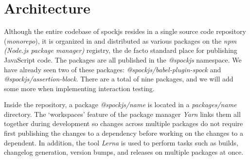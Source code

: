 \section{Architecture}
Although the entire codebase of spockjs resides in
a single source code repository (\textit{monorepo}),
it is organized in and distributed as various packages
on the \textit{npm (Node.js package manager)} registry,
\autocite{Npm}
the de facto standard place for publishing JavaScript code.
The packages are all published in the \textit{@spockjs} namespace.
We have already seen two of these packages:
\textit{@spockjs/babel-plugin-spock} and \textit{@spockjs/assertion-block}.
There are a total of nine packages,
and we will add some more when implementing interaction testing.

Inside the repository, a package \textit{@spockjs/name}
is located in a \textit{packages/name} directory.
The `workspaces' feature \autocite{YarnWorkspacesDoc}
of the package manager \textit{Yarn}
links them all together during development
so changes across multiple packages do not require
first publishing the changes to a dependency
before working on the changes to a dependent.
In addition, the tool \textit{Lerna} \autocite{LernaGithub} is used to
perform tasks such as builds, changelog generation, version bumps, and releases
on multiple packages at once.
